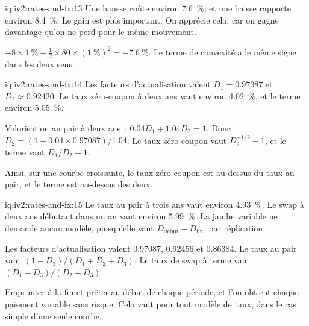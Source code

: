 \begin{solution}{iq:iv2:rates-and-fx:13}
Une hausse coûte environ 7.6~\%, et une baisse rapporte environ 8.4~\%. Le gain est plus important. On apprécie cela, car on gagne davantage qu'on ne perd pour le même mouvement.

$-8 \times 1~\% + \tfrac12 \times 80 \times (1~\%)^2 = -7.6~\%$. Le terme de convexité a le même signe dans les deux sens.

\end{solution}

\begin{solution}{iq:iv2:rates-and-fx:14}
Les facteurs d'actualisation valent $D_1 = 0.97087$ et $D_2 \approx 0.92420$. Le taux zéro-coupon à deux ans vaut environ 4.02~\%, et le terme environ 5.05~\%.

Valorisation au pair à deux ans~: $0.04D_1 + 1.04D_2 = 1$. Donc $D_2 = (1 - 0.04 \times 0.97087)/1.04$. Le taux zéro-coupon vaut $D_2^{-1/2} - 1$, et le terme vaut $D_1/D_2 - 1$.

Ainsi, sur une courbe croissante, le taux zéro-coupon est au-dessus du taux au pair, et le terme est au-dessus des deux.

\end{solution}

\begin{solution}{iq:iv2:rates-and-fx:15}
Le taux au pair à trois ans vaut environ 4.93~\%. Le swap à deux ans débutant dans un an vaut environ 5.99~\%. La jambe variable ne demande aucun modèle, puisqu'elle vaut $D_{\text{début}} - D_{\text{fin}}$, par réplication.

Les facteurs d'actualisation valent 0.97087, 0.92456 et 0.86384. Le taux au pair vaut $(1 - D_3)/(D_1 + D_2 + D_3)$. Le taux de swap à terme vaut $(D_1 - D_3)/(D_2 + D_3)$.

Emprunter à la fin et prêter au début de chaque période, et l'on obtient chaque paiement variable sans risque. Cela vaut pour tout modèle de taux, dans le cas simple d'une seule courbe.

\end{solution}

